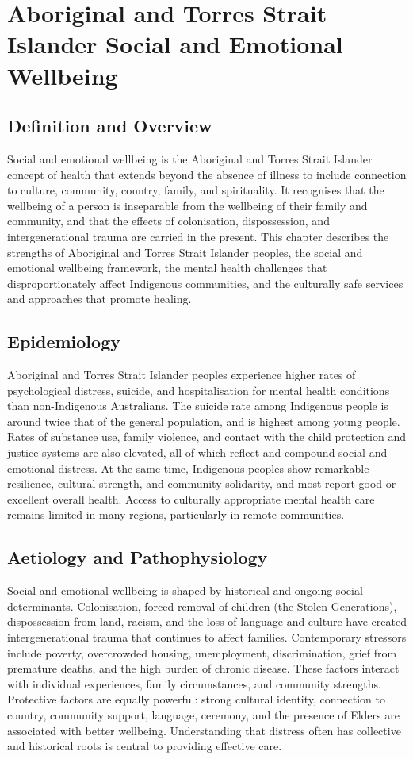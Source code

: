 \chapter{Aboriginal and Torres Strait Islander Social and Emotional Wellbeing}

\section*{Definition and Overview}
Social and emotional wellbeing is the Aboriginal and Torres Strait Islander concept of health that extends beyond the absence of illness to include connection to culture, community, country, family, and spirituality. It recognises that the wellbeing of a person is inseparable from the wellbeing of their family and community, and that the effects of colonisation, dispossession, and intergenerational trauma are carried in the present. This chapter describes the strengths of Aboriginal and Torres Strait Islander peoples, the social and emotional wellbeing framework, the mental health challenges that disproportionately affect Indigenous communities, and the culturally safe services and approaches that promote healing.

\section*{Epidemiology}
Aboriginal and Torres Strait Islander peoples experience higher rates of psychological distress, suicide, and hospitalisation for mental health conditions than non-Indigenous Australians. The suicide rate among Indigenous people is around twice that of the general population, and is highest among young people. Rates of substance use, family violence, and contact with the child protection and justice systems are also elevated, all of which reflect and compound social and emotional distress. At the same time, Indigenous peoples show remarkable resilience, cultural strength, and community solidarity, and most report good or excellent overall health. Access to culturally appropriate mental health care remains limited in many regions, particularly in remote communities.

\section*{Aetiology and Pathophysiology}
Social and emotional wellbeing is shaped by historical and ongoing social determinants. Colonisation, forced removal of children (the Stolen Generations), dispossession from land, racism, and the loss of language and culture have created intergenerational trauma that continues to affect families. Contemporary stressors include poverty, overcrowded housing, unemployment, discrimination, grief from premature deaths, and the high burden of chronic disease. These factors interact with individual experiences, family circumstances, and community strengths. Protective factors are equally powerful: strong cultural identity, connection to country, community support, language, ceremony, and the presence of Elders are associated with better wellbeing. Understanding that distress often has collective and historical roots is central to providing effective care.

